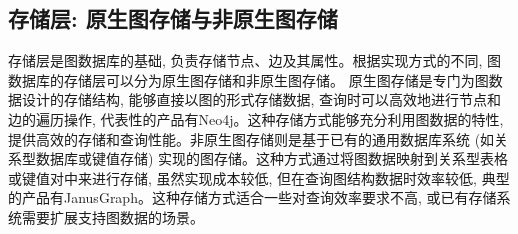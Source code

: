 \subsection{存储层: 原生图存储与非原生图存储}

存储层是图数据库的基础, 负责存储节点、边及其属性。根据实现方式的不同, 图数据库的存储层可以分为原生图存储和非原生图存储。
原生图存储是专门为图数据设计的存储结构, 能够直接以图的形式存储数据, 查询时可以高效地进行节点和边的遍历操作, 代表性的产品有Neo4j。这种存储方式能够充分利用图数据的特性, 提供高效的存储和查询性能。非原生图存储则是基于已有的通用数据库系统 (如关系型数据库或键值存储) 实现的图存储。这种方式通过将图数据映射到关系型表格或键值对中来进行存储, 虽然实现成本较低, 但在查询图结构数据时效率较低, 典型的产品有JanusGraph。这种存储方式适合一些对查询效率要求不高, 或已有存储系统需要扩展支持图数据的场景。
